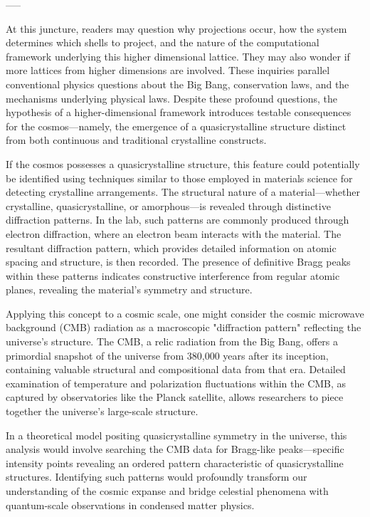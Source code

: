 \documentclass{article}
\begin{document}
-----

At this juncture, readers may question why projections occur, how the system determines which shells to project, and the nature of the computational framework underlying this higher dimensional lattice. They may also wonder if more lattices from higher dimensions are involved. These inquiries parallel conventional physics questions about the Big Bang, conservation laws, and the mechanisms underlying physical laws. Despite these profound questions, the hypothesis of a higher-dimensional framework introduces testable consequences for the cosmos—namely, the emergence of a quasicrystalline structure distinct from both continuous and traditional crystalline constructs.

If the cosmos possesses a quasicrystalline structure, this feature could potentially be identified using techniques similar to those employed in materials science for detecting crystalline arrangements. The structural nature of a material—whether crystalline, quasicrystalline, or amorphous—is revealed through distinctive diffraction patterns. In the lab, such patterns are commonly produced through electron diffraction, where an electron beam interacts with the material. The resultant diffraction pattern, which provides detailed information on atomic spacing and structure, is then recorded. The presence of definitive Bragg peaks within these patterns indicates constructive interference from regular atomic planes, revealing the material's symmetry and structure.

Applying this concept to a cosmic scale, one might consider the cosmic microwave background (CMB) radiation as a macroscopic "diffraction pattern" reflecting the universe's structure. The CMB, a relic radiation from the Big Bang, offers a primordial snapshot of the universe from 380,000 years after its inception, containing valuable structural and compositional data from that era. Detailed examination of temperature and polarization fluctuations within the CMB, as captured by observatories like the Planck satellite, allows researchers to piece together the universe's large-scale structure.

In a theoretical model positing quasicrystalline symmetry in the universe, this analysis would involve searching the CMB data for Bragg-like peaks—specific intensity points revealing an ordered pattern characteristic of quasicrystalline structures. Identifying such patterns would profoundly transform our understanding of the cosmic expanse and bridge celestial phenomena with quantum-scale observations in condensed matter physics.
\end{document}
